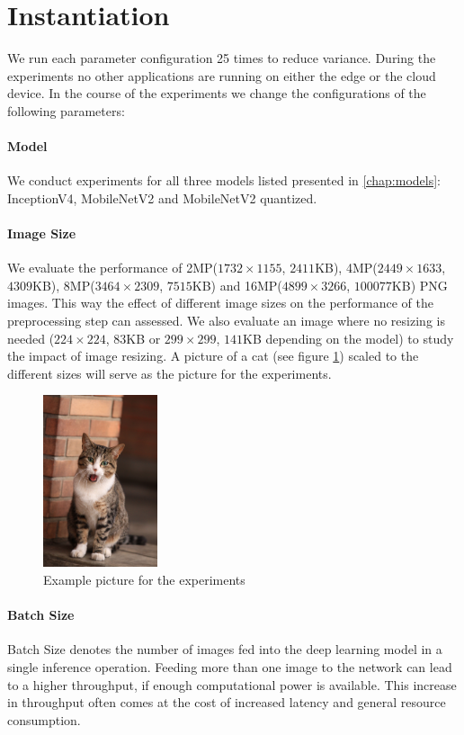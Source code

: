 \section{Instantiation}
We run each parameter configuration 25 times to reduce variance. During the experiments no other applications are running on either the edge or the cloud device.
In the course of the experiments we change the configurations of the following parameters:
\paragraph{Model}
We conduct experiments for all three models listed presented in \ref{chap:models}: InceptionV4, MobileNetV2 and MobileNetV2 quantized.
\paragraph{Image Size}
We evaluate the performance of 2MP($1732\times1155$, $2411$KB), 4MP($2449\times1633$, $4309$KB), 8MP($3464\times2309$, $7515$KB) and 16MP($4899\times3266$, $100077$KB) PNG images. This way the effect of different image sizes on the performance of the preprocessing step can assessed. We also evaluate an image where no resizing is needed ($224\times224$, $83$KB or $299\times299$, $141$KB depending on the model) to study the impact of image resizing. A picture of a cat (see figure \ref{fig:cat}) scaled to the different sizes will serve as the picture for the experiments.
\begin{figure}[H]
\centering
\includegraphics[width=0.3\textwidth]{./Bilder/European_cat_02_16_mp.jpg}
\caption{Example picture for the experiments \cite{cat}}
\label{fig:cat}
\end{figure}
\paragraph{Batch Size}
Batch Size denotes the number of images fed into the deep learning model in a single inference operation. 
Feeding more than one image to the network can lead to a higher throughput, if enough computational power is available. This increase in throughput often comes at the cost of increased latency and general resource consumption.

